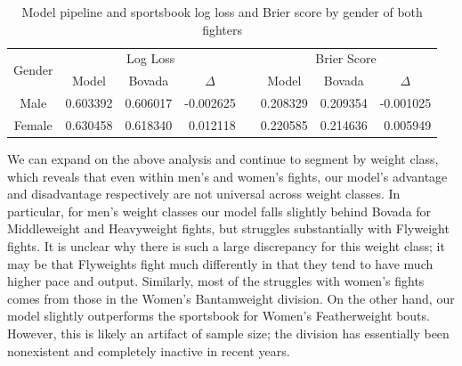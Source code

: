 \documentclass[12pt,twoside]{report}
\begin{document}
\begin{table}[!htb]
\centering
\begin{tabular}{@{}cccrcccr@{}}
\toprule
\multirow{2}{*}{Gender} & \multicolumn{3}{c}{Log Loss}                       & \multirow{2}{*}{} & \multicolumn{3}{c}{Brier Score}                    \\ \cmidrule(lr){2-4} \cmidrule(l){6-8} 
                        & Model    & Bovada   & \multicolumn{1}{c}{$\Delta$} &                   & Model    & Bovada   & \multicolumn{1}{c}{$\Delta$} \\ \midrule
Male                    & 0.603392 & 0.606017 & -0.002625                    &                   & 0.208329 & 0.209354 & -0.001025                    \\
Female                  & 0.630458 & 0.618340 & 0.012118                     &                   & 0.220585 & 0.214636 & 0.005949                     \\ \bottomrule
\end{tabular}
\caption{Model pipeline and sportsbook log loss and Brier score by gender of both fighters}
\end{table}

We can expand on the above analysis and continue to segment by weight class, which reveals that even within men's and women's fights, our model's advantage and disadvantage respectively are not universal across weight classes. In particular, for men's weight classes our model falls slightly behind Bovada for Middleweight and Heavyweight fights, but struggles substantially with Flyweight fights. It is unclear why there is such a large discrepancy for this weight class; it may be that Flyweights fight much differently in that they tend to have much higher pace and output. Similarly, most of the struggles with women's fights comes from those in the Women's Bantamweight division. On the other hand, our model slightly outperforms the sportsbook for Women's Featherweight bouts. However, this is likely an artifact of sample size; the division has essentially been nonexistent and completely inactive in recent years.
\end{document}
